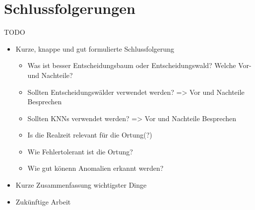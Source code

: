 \chapter{Schlussfolgerungen}
TODO

\begin{itemize}
    \item Kurze, knappe und gut formulierte Schlussfolgerung
    \begin{itemize}
        \item Was ist besser Entscheidungsbaum oder Entscheidungswald? Welche Vor- und Nachteile?
        \item Sollten Entscheidungswälder verwendet werden? => Vor und Nachteile Besprechen
        \item Sollten KNNs verwendet werden? => Vor und Nachteile Besprechen
        \item Is die Realzeit relevant für die Ortung(?)
        \item Wie Fehlertolerant ist die Ortung?
        \item Wie gut könenn Anomalien erkannt werden?
    \end{itemize}
    \item Kurze Zusammenfassung wichtigster Dinge
    \item Zukünftige Arbeit
\end{itemize}